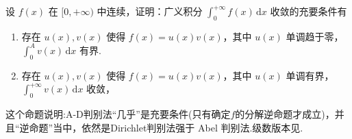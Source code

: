 \documentclass[../../main.tex]{subfiles}
\begin{document}
\begin{proposition}\label{proposition:A-D判别法是积分收敛的“充要条件”}
设 $f(x)$ 在 $[0,+\infty)$ 中连续，证明：广义积分 $\int_{0}^{+\infty}f(x)\,\mathrm{d}x$ 收敛的充要条件有
\begin{enumerate}
\item 存在 $u(x),v(x)$ 使得 $f(x)=u(x)v(x)$，其中 $u(x)$ 单调趋于零，$\int_{0}^{A}v(x)\,\mathrm{d}x$ 有界.

\item 存在 $u(x),v(x)$ 使得 $f(x)=u(x)v(x)$，其中 $u(x)$ 单调有界，$\int_{0}^{+\infty}v(x)\,\mathrm{d}x$ 收敛，
\end{enumerate}
\end{proposition}
\begin{note}
这个命题说明:A-D判别法“几乎”是充要条件(只有确定$f$的分解逆命题才成立)，并且“逆命题”当中，依然是Dirichlet判别法强于 Abel 判别法.级数版本见.
\end{note}
\end{document}
